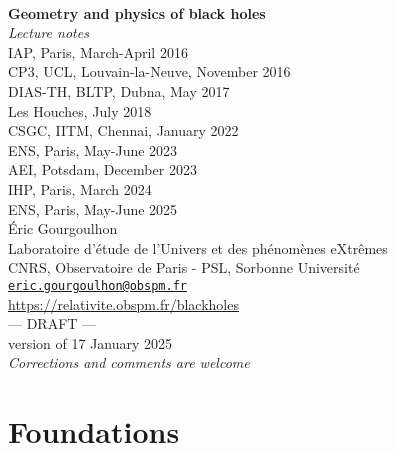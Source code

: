 \documentclass[12pt,a4paper]{book}
\begin{document}
\begin{titlepage}
\
\vspace{4cm}
\begin{center}
{\Huge\textbf{Geometry and physics of black holes}}\\[2ex]
{\Huge\emph{Lecture notes}}\\[3ex]
{\large IAP, Paris, March-April 2016} \\[1ex]
{\large CP3, UCL, Louvain-la-Neuve, November 2016}\\[1ex]
{\large DIAS-TH, BLTP, Dubna, May 2017}\\[1ex]
{\large Les Houches, July 2018}\\[1ex]
{\large CSGC, IITM, Chennai, January 2022}\\[1ex]
{\large ENS, Paris, May-June 2023}\\[1ex]
{\large AEI, Potsdam, December 2023}\\[1ex]
{\large IHP, Paris, March 2024}\\[1ex]
{\large ENS, Paris, May-June 2025}\\[8ex]
Éric Gourgoulhon\\
Laboratoire d’étude de l’Univers et des phénomènes eXtrêmes\\
CNRS, Observatoire de Paris - PSL, Sorbonne Université\\
\href{mailto:eric.gourgoulhon@obspm.fr}{\texttt{eric.gourgoulhon@obspm.fr}}\\[8ex]
\url{https://relativite.obspm.fr/blackholes}\\[8ex]
{\Huge --- DRAFT ---}\\[2ex]
{version of 17 January 2025}\\[2ex]
\emph{\Large Corrections and comments are welcome}
\end{center}
\end{titlepage}


\dominitoc

\newpage


\setcounter{tocdepth}{1}  %
\tableofcontents

\part{Foundations}


\end{document}

